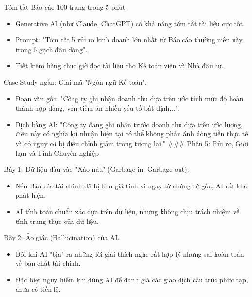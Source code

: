\documentclass[aspectratio=169]{beamer}
\begin{document}
\begin{frame}{Tóm tắt Báo cáo 100 trang trong 5 phút.}
    \begin{itemize}
        \item Generative AI (như Claude, ChatGPT) có khả năng tóm tắt tài liệu cực tốt.
        \item Prompt: "Tóm tắt 5 rủi ro kinh doanh lớn nhất từ Báo cáo thường niên này trong 5 gạch đầu dòng".
        \item Tiết kiệm hàng chục giờ đọc tài liệu cho Kế toán viên và Nhà đầu tư.
    \end{itemize}
\end{frame}


\begin{frame}{Case Study ngắn: Giải mã "Ngôn ngữ Kế toán".}
    \begin{itemize}
        \item Đoạn văn gốc: "Công ty ghi nhận doanh thu dựa trên ước tính mức độ hoàn thành hợp đồng, vốn tiềm ẩn nhiều yếu tố bất định...".
        \item Dịch bằng AI: "Công ty đang ghi nhận trước doanh thu dựa trên ước lượng, điều này có nghĩa lợi nhuận hiện tại có thể không phản ánh dòng tiền thực tế và có nguy cơ bị điều chỉnh giảm trong tương lai."
        ### Phần 5: Rủi ro, Giới hạn và Tính Chuyên nghiệp
    \end{itemize}
\end{frame}


\begin{frame}{Bẫy 1: Dữ liệu đầu vào "Xào nấu" (Garbage in, Garbage out).}
    \begin{itemize}
        \item Nếu Báo cáo tài chính đã bị làm giả tinh vi ngay từ chứng từ gốc, AI rất khó phát hiện.
        \item AI tính toán chuẩn xác dựa trên dữ liệu, nhưng không chịu trách nhiệm về tính trung thực của dữ liệu.
    \end{itemize}
\end{frame}


\begin{frame}{Bẫy 2: Ảo giác (Hallucination) của AI.}
    \begin{itemize}
        \item Đôi khi AI "bịa" ra những lời giải thích nghe rất hợp lý nhưng sai hoàn toàn về bản chất tài chính.
        \item Đặc biệt nguy hiểm khi dùng AI để đánh giá các giao dịch cấu trúc phức tạp, chưa có tiền lệ.
    \end{itemize}
\end{frame}
\end{document}
